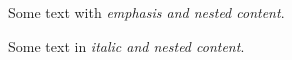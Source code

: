 \documentclass{article}
\begin{document}
Some text with \emph{emphasis and \emph{nested} content}.

Some text in \textit{italic and \textit{nested} content}.
\end{document}
